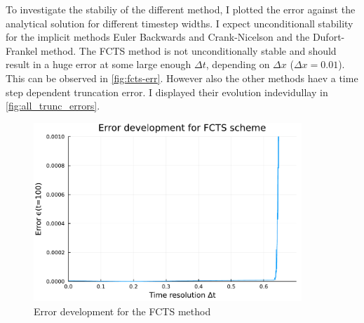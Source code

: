 \documentclass[
	a4paper, %
	10pt, %
]{CSUniSchoolLabReport}
\begin{document}
To investigate the stabiliy of the different method, I plotted the error against the analytical solution for different timestep widths. I expect unconditionall stability for the implicit methods Euler Backwards and Crank-Nicelson and the Dufort-Frankel method. The FCTS method is not unconditionally stable and should result in a huge error at some large enough $\Delta t$, depending on $\Delta x$ ($\Delta x = 0.01$). This can be observed in \autoref{fig:fcts-err}. However also the other methods haev a time step dependent truncation error. I displayed their evolution indevidullay in \autoref{fig:all_trunc_errors}.

\begin{figure}[H]
	\centering
	\includegraphics[width=0.9\textwidth]{../saves_t2/error_development_fcts.pdf}
	\caption{Error development for the FCTS method}
	\label{fig:fcts-err}
\end{figure}
\end{document}
